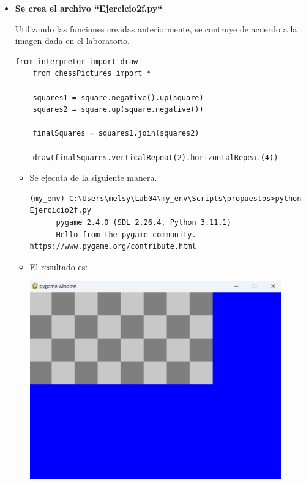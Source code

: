 \documentclass{article}
\begin{document}
\begin{itemize}
  \pagebreak

  \item \textbf{Se crea el archivo ``Ejercicio2f.py``}
  
  \vspace{\baselineskip}

  Utilizando las funciones creadas anteriormente, se contruye de acuerdo a la imagen dada en el laboratorio.

    \begin{lstlisting}[style=python]
    from interpreter import draw
    from chessPictures import *

    squares1 = square.negative().up(square)
    squares2 = square.up(square.negative())

    finalSquares = squares1.join(squares2)

    draw(finalSquares.verticalRepeat(2).horizontalRepeat(4))
    \end{lstlisting}

    \vspace{\baselineskip}

    \begin{itemize}
      \item Se ejecuta de la siguiente manera.

      \begin{lstlisting}[style=shell]
      (my_env) C:\Users\melsy\Lab04\my_env\Scripts\propuestos>python Ejercicio2f.py
      pygame 2.4.0 (SDL 2.26.4, Python 3.11.1)
      Hello from the pygame community. https://www.pygame.org/contribute.html
      \end{lstlisting}

      \vspace{2\baselineskip}

      \item El resultado es:
      
      \vspace{\baselineskip}

      \begin{minipage}{\linewidth}
        \centering
        \includegraphics[width=0.9\textwidth]{imagenes/p_ej2f.png}
      \end{minipage}
    \end{itemize}


\end{itemize}
\end{document}
